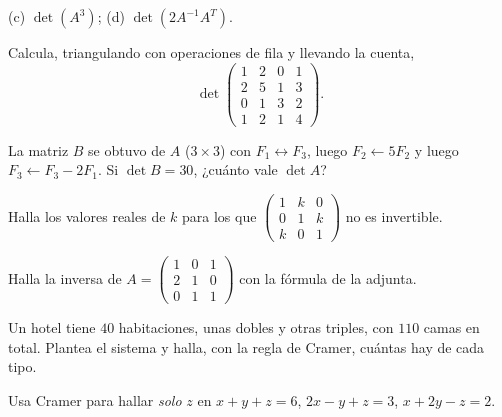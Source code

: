 \documentclass[11pt,a4paper]{article}
\begin{document}
\begin{ejercicios}[itemsep=6pt]
  (c) $\det\left(A^3\right)$; (d) $\det\left(2A^{-1}A^T\right)$.
\item Calcula, triangulando con operaciones de fila y llevando la cuenta,
  \[ \det\begin{pmatrix} 1 & 2 & 0 & 1\\ 2 & 5 & 1 & 3\\ 0 & 1 & 3 & 2\\ 1 & 2 & 1 & 4\end{pmatrix}. \]
\item La matriz $B$ se obtuvo de $A$ ($3\times3$) con $F_1\leftrightarrow F_3$, luego $F_2\leftarrow5F_2$ y luego
  $F_3\leftarrow F_3-2F_1$. Si $\det B=30$, ¿cuánto vale $\det A$?
\item Halla los valores reales de $k$ para los que $\begin{pmatrix} 1 & k & 0\\ 0 & 1 & k\\ k & 0 & 1\end{pmatrix}$ no es invertible.
\item Halla la inversa de $A=\begin{pmatrix} 1 & 0 & 1\\ 2 & 1 & 0\\ 0 & 1 & 1\end{pmatrix}$ con la fórmula de la adjunta.
\item \begin{ejercicios}
  \item Un hotel tiene $40$ habitaciones, unas dobles y otras triples, con $110$ camas en total. Plantea el sistema
  y halla, con la regla de Cramer, cuántas hay de cada tipo.
  \item Usa Cramer para hallar \emph{solo} $z$ en $x+y+z=6$, $2x-y+z=3$, $x+2y-z=2$.
  \end{ejercicios}
\end{ejercicios}
\end{document}
